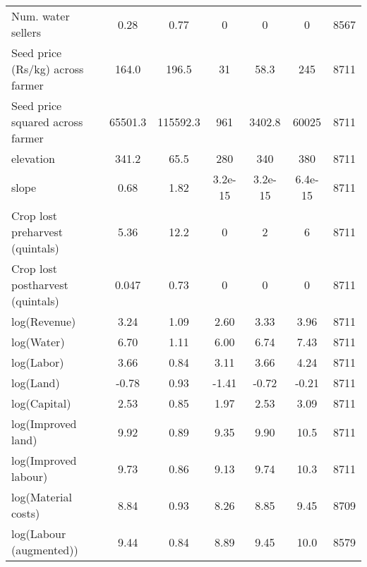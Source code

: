 \begin{table}[htbp]
\begin{tabular*}{1.0\hsize}{@{\hskip\tabcolsep\extracolsep\fill}l*{1}{cccccc}}
Num. water sellers                  &        0.28&        0.77&           0&           0&           0&        8567\\
Seed price (Rs/kg) across farmer    &       164.0&       196.5&          31&        58.3&         245&        8711\\
Seed price squared across farmer    &     65501.3&    115592.3&         961&      3402.8&       60025&        8711\\
elevation                           &       341.2&        65.5&         280&         340&         380&        8711\\
slope                               &        0.68&        1.82&     3.2e-15&     3.2e-15&     6.4e-15&        8711\\
Crop lost preharvest (quintals)     &        5.36&        12.2&           0&           2&           6&        8711\\
Crop lost postharvest (quintals)    &       0.047&        0.73&           0&           0&           0&        8711\\
log(Revenue)                        &        3.24&        1.09&        2.60&        3.33&        3.96&        8711\\
log(Water)                          &        6.70&        1.11&        6.00&        6.74&        7.43&        8711\\
log(Labor)                          &        3.66&        0.84&        3.11&        3.66&        4.24&        8711\\
log(Land)                           &       -0.78&        0.93&       -1.41&       -0.72&       -0.21&        8711\\
log(Capital)                        &        2.53&        0.85&        1.97&        2.53&        3.09&        8711\\
log(Improved land)                  &        9.92&        0.89&        9.35&        9.90&        10.5&        8711\\
log(Improved labour)                &        9.73&        0.86&        9.13&        9.74&        10.3&        8711\\
log(Material costs)                 &        8.84&        0.93&        8.26&        8.85&        9.45&        8709\\
log(Labour (augmented))             &        9.44&        0.84&        8.89&        9.45&        10.0&        8579\\
\bottomrule
\end{tabular*}
\end{table}

